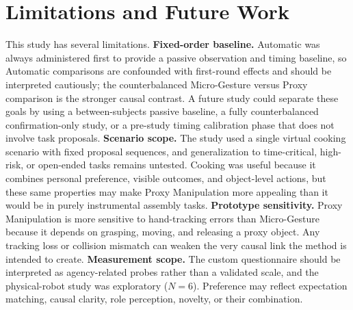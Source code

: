 \documentclass[sigconf,review,anonymous]{acmart}
\begin{document}
\section{Limitations and Future Work}\label{sec:limitations}
This study has several limitations. \textbf{Fixed-order baseline.} Automatic was always administered first to provide a passive observation and timing baseline, so Automatic comparisons are confounded with first-round effects and should be interpreted cautiously; the counterbalanced Micro-Gesture versus Proxy comparison is the stronger causal contrast. A future study could separate these goals by using a between-subjects passive baseline, a fully counterbalanced confirmation-only study, or a pre-study timing calibration phase that does not involve task proposals. \textbf{Scenario scope.} The study used a single virtual cooking scenario with fixed proposal sequences, and generalization to time-critical, high-risk, or open-ended tasks remains untested. Cooking was useful because it combines personal preference, visible outcomes, and object-level actions, but these same properties may make Proxy Manipulation more appealing than it would be in purely instrumental assembly tasks. \textbf{Prototype sensitivity.} Proxy Manipulation is more sensitive to hand-tracking errors than Micro-Gesture because it depends on grasping, moving, and releasing a proxy object. Any tracking loss or collision mismatch can weaken the very causal link the method is intended to create. \textbf{Measurement scope.} The custom questionnaire should be interpreted as agency-related probes rather than a validated scale, and the physical-robot study was exploratory ($N=6$). Preference may reflect expectation matching, causal clarity, role perception, novelty, or their combination.
\end{document}
